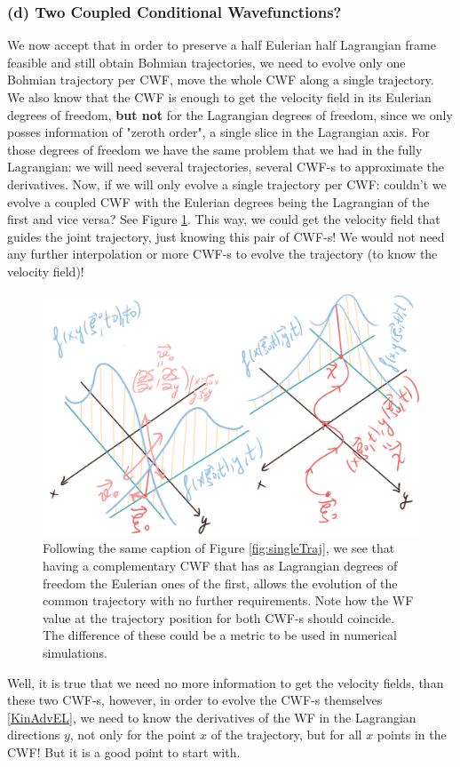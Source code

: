 \documentclass[11pt, a4paper]{article} %
\begin{document}
\subsubsection*{(d) Two Coupled Conditional Wavefunctions?}

We now accept that in order to preserve a half Eulerian half Lagrangian frame feasible and still obtain Bohmian trajectories, we need to evolve only one Bohmian trajectory per CWF, move the whole CWF along a single trajectory. We also know that the CWF is enough to get the velocity field in its Eulerian degrees of freedom, {\bf but not} for the Lagrangian degrees of freedom, since we only posses information of "zeroth order", a single slice in the Lagrangian axis. For those degrees of freedom we have the same problem that we had in the fully Lagrangian: we will need several trajectories, several CWF-s to approximate the derivatives. Now, if we will only evolve a single trajectory per CWF: couldn't we evolve a coupled CWF with the Eulerian degrees being the Lagrangian of the first and vice versa? See Figure \ref{fig:pair_bohm}. This way, we could get the velocity field that guides the joint trajectory, just knowing this pair of CWF-s! We would not need any further interpolation or more CWF-s to evolve the trajectory (to know the velocity field)!

\begin{figure}[h!]
  \centering
    \includegraphics[width=0.65\linewidth]{bohmian_pair.png}
  \caption{Following the same caption of Figure \ref{fig:singleTraj}, we see that having a complementary CWF that has as Lagrangian degrees of freedom the Eulerian ones of the first, allows the evolution of the common trajectory with no further requirements. Note how the WF value at the trajectory position for both CWF-s should coincide. The difference of these could be a metric to be used in numerical simulations.  }
  \label{fig:pair_bohm}
\end{figure}

Well, it is true that we need no more information to get the velocity fields, than these two CWF-s, however, in order to evolve the CWF-s themselves \eqref{KinAdvEL}, we need to know the derivatives of the WF in the Lagrangian directions $y$, not only for the point $x$ of the trajectory, but for all $x$ points in the CWF! But it is a good point to start with.
\end{document}
